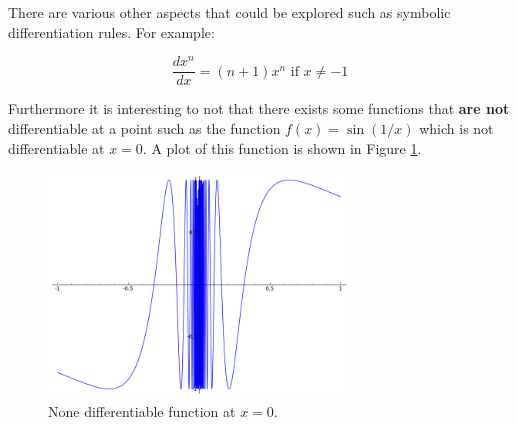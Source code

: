 \documentclass[a4paper]{article}
\theoremstyle{break}
\begin{document}
There are various other aspects that could be explored such as symbolic differentiation rules. For example:

$$\frac{dx^n}{dx}=(n+1)x^{n}\text{ if }x\ne-1$$

Furthermore it is interesting to not that there exists some functions that \textbf{are not} differentiable at a point such as the function $f(x)=\sin(1/x)$ which is not differentiable at $x=0$. A plot of this function is shown in Figure \ref{notdiff}.

\begin{figure}[!htbp]
\begin{center}
\includegraphics[width=8cm]{sage2.png}
\end{center}
\caption{None differentiable function at $x=0$.}\label{notdiff}
\end{figure}




\end{document}
